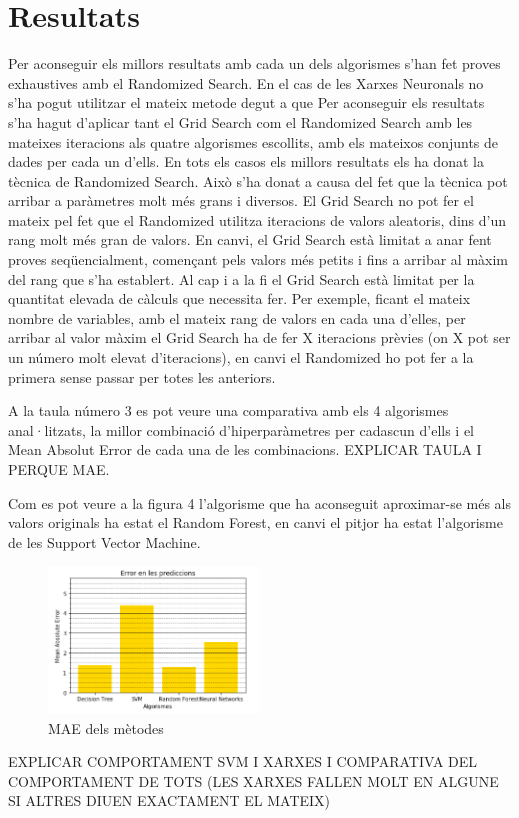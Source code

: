 \documentclass[10pt,a4paper,twocolumn,twoside]{article}
\begin{document}
\section{Resultats}
Per aconseguir els millors resultats amb cada un dels algorismes s'han fet proves exhaustives amb el Randomized Search. En el cas de les Xarxes Neuronals no s'ha pogut utilitzar el mateix metode degut a que 
Per aconseguir els resultats s'ha hagut d'aplicar tant el Grid Search com el Randomized Search amb les mateixes iteracions als quatre algorismes escollits, amb els mateixos conjunts de dades per cada un d'ells. En tots els casos els millors resultats els ha donat la tècnica de Randomized Search. Això s'ha donat a causa del fet que la tècnica pot arribar a paràmetres molt més grans i diversos. El Grid Search no pot fer el mateix pel fet que el Randomized utilitza iteracions de valors aleatoris, dins d'un rang molt més gran de valors. En canvi, el Grid Search està limitat a anar fent proves seqüencialment, començant pels valors més petits i fins a arribar al màxim del rang que s'ha establert. Al cap i a la fi el Grid Search està limitat per la quantitat elevada de càlculs que necessita fer. Per exemple, ficant el mateix nombre de variables, amb el mateix rang de valors en cada una d'elles, per arribar al valor màxim el Grid Search ha de fer X iteracions prèvies (on X pot ser un número molt elevat d'iteracions), en canvi el Randomized ho pot fer a la primera sense passar per totes les anteriors.

A la taula número 3 es pot veure una comparativa amb els 4 algorismes anal·litzats, la millor combinació d'hiperparàmetres per cadascun d'ells i el Mean Absolut Error de cada una de les combinacions. EXPLICAR TAULA I PERQUE MAE.

Com es pot veure a la figura 4 l'algorisme que ha aconseguit aproximar-se més als valors originals ha estat el Random Forest, en canvi el pitjor ha estat l'algorisme de les Support Vector Machine.
\begin{figure}[!h]
\centering
	\includegraphics[width=0.5\textwidth]{../img/comparacioMetricsAlgs}
	\caption{MAE dels mètodes}
	\label{fig-Metrics}
\end{figure}
 EXPLICAR COMPORTAMENT SVM I XARXES I COMPARATIVA DEL COMPORTAMENT DE TOTS (LES XARXES FALLEN MOLT EN ALGUNE SI ALTRES DIUEN EXACTAMENT EL MATEIX)
\end{document}
